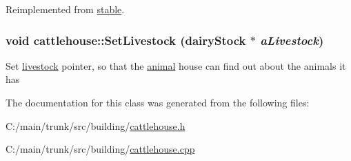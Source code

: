 Reimplemented from \hyperlink{classstable_ab0195f308a48e008485cf5d04955a741}{stable}.\hypertarget{classcattlehouse_ac9e26b19cc9e27590857650922c928a7}{
\subsubsection[{SetLivestock}]{\setlength{\rightskip}{0pt plus 5cm}void cattlehouse::SetLivestock ({\bf dairyStock} $\ast$ {\em aLivestock})}}
\label{classcattlehouse_ac9e26b19cc9e27590857650922c928a7}
Set \hyperlink{classlivestock}{livestock} pointer, so that the \hyperlink{classanimal}{animal} house can find out about the animals it has 

The documentation for this class was generated from the following files:\begin{DoxyCompactItemize}
\item 
C:/main/trunk/src/building/\hyperlink{cattlehouse_8h}{cattlehouse.h}\item 
C:/main/trunk/src/building/\hyperlink{cattlehouse_8cpp}{cattlehouse.cpp}\end{DoxyCompactItemize}
